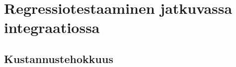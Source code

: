 \section{Regressiotestaaminen jatkuvassa integraatiossa}

\subsection{Kustannustehokkuus}


\clearpage